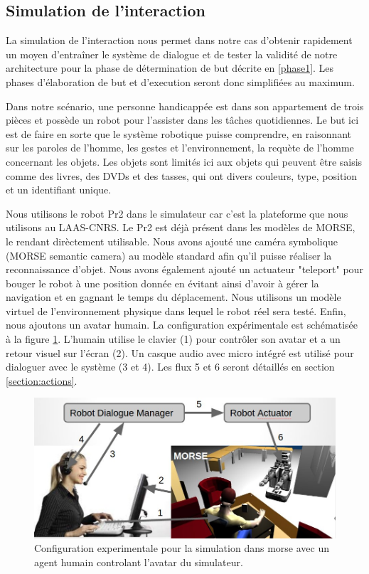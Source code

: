 \documentclass[a4paper,11pt,twoside]{StyleThese}
\begin{document}
\subsection{Simulation de l'interaction}

La simulation de l'interaction nous permet dans notre cas d'obtenir rapidement un moyen d'entraîner le système de dialogue et de tester la validité de notre architecture pour la phase de détermination de but décrite en \ref{phase1}.
Les phases d'élaboration de but et d'execution seront donc simplifiées au maximum.

Dans notre scénario, une personne handicappée est dans son appartement de trois pièces et possède un robot pour l'assister dans les tâches quotidiennes.
Le but ici est de faire en sorte que le système robotique puisse comprendre, en raisonnant sur les paroles de l'homme, les gestes et l'environnement, la requète de l'homme concernant les objets. Les objets sont limités ici aux objets qui peuvent être saisis comme des livres, des DVDs et des tasses, qui ont divers couleurs, type, position et un identifiant unique.

Nous utilisons le robot Pr2 dans le simulateur car c'est la plateforme que nous utilisons au LAAS-CNRS. Le Pr2 est déjà présent dans les modèles de MORSE, le rendant dirèctement utilisable. Nous avons ajouté une caméra symbolique (MORSE semantic camera) au modèle standard afin qu'il puisse réaliser la reconnaissance d'objet. Nous avons également ajouté un actuateur "teleport" pour bouger le robot à une position donnée en évitant ainsi d'avoir à gérer la navigation et en gagnant le temps du déplacement. Nous utilisons un modèle virtuel de l'environnement physique dans lequel le robot réel sera testé. Enfin, nous ajoutons un avatar humain. La configuration expérimentale est schématisée à la figure \ref{fig:simusetup}. L'humain utilise le clavier (1) pour contrôler son avatar et a un retour visuel sur l'écran (2). Un casque audio avec micro intégré est utilisé pour dialoguer avec le système (3 et 4). Les flux 5 et 6 seront détaillés en section \ref{section:actions}. 

\begin{figure}[ht!]
 \centering
  \includegraphics[width=0.89\linewidth]{./img/simusetup.jpg} 
  \caption {Configuration experimentale pour la simulation dans morse avec un agent humain controlant l'avatar du simulateur.}
  \label{fig:simusetup}
\end{figure}
\end{document}
